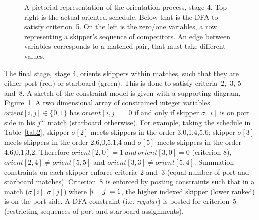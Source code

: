 \documentclass{llncs}
\DeclarePairedDelimiter\abs{\lvert}{\rvert}
\begin{document}
\begin{figure}[tb]
    \caption{A pictorial representation of the orientation process, stage 4. Top right is the actual
        oriented schedule. Below that is the DFA to satisfy criterion~5. On the left is the zero/one
        variables, a row representing a skipper's sequence of competitors. An edge between variables
        corresponds to a matched pair, that must take different values.}\label{oriented}
\end{figure}

The final stage, stage 4, orients skippers within matches, such that they are either port (red) or
starboard (green). This is done to satisfy criteria~2,~3, 5 and~8. A sketch of the constraint
model is given with a supporting diagram, Figure~\ref{oriented}.  A two dimensional array 
of constrained integer variables $orient[i,j] \in \{0,1\}$ has $orient[i,j] = 0$ if and only if skipper $\sigma[i]$ is on port side in his $j^{th}$ match (starboard otherwise).
For example, taking the schedule in Table~\ref{tab2}, skipper 
$\sigma[{2}]$ meets skippers in the order 3,0,1,4,5,6; skipper 
$\sigma[3]$ meets skippers in the order 2,6,0,5,1,4 and 
$\sigma[{5}]$ meets skippers in the order 4,6,0,1,3,2.  Therefore
$orient[2,0] = 1 ~and~ orient[3,0] = 0$ (criterion 8),
$orient[2,4] \neq orient[5,5]$ and
$orient[3,3] \neq orient[5,4]$.
Summation constraints on each skipper enforce
criteria~2 and~3 (equal number of port and starboard matches). Criterion~8 is enforced by posting
constraints such that in a match ($\sigma[{i}],\sigma[{j}]$) where $\abs*{i - j} = 1$, the higher 
indexed skipper (lower ranked) is on the port side. A DFA constraint (i.e. \emph{regular}) is posted for criterion~5
(restricting sequences of port and starboard assignments).
\end{document}
